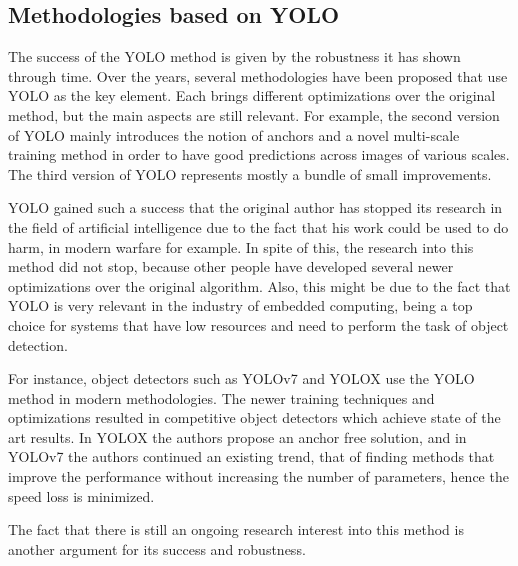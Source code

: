\subsection{Methodologies based on YOLO}

The success of the YOLO method is given by the robustness it has shown through time. Over the years, several methodologies have been proposed that use YOLO as the key element. Each brings different optimizations over the original method, but the main aspects are still relevant. For example, the second version of YOLO \cite{yolov2} mainly introduces the notion of anchors and a novel multi-scale training method in order to have good predictions across images of various scales. The third version of YOLO \cite{yolov3} represents mostly a bundle of small improvements. 

YOLO gained such a success that the original author has stopped its research in the field of artificial intelligence due to the fact that his work could be used to do harm, in modern warfare for example. In spite of this, the research into this method did not stop, because other people have developed several newer optimizations over the original algorithm. Also, this might be due to the fact that YOLO is very relevant in the industry of embedded computing, being a top choice for systems that have low resources and need to perform the task of object detection.

For instance, object detectors such as YOLOv7 \cite{yolov7} and YOLOX \cite{yolox} use the YOLO method in modern methodologies. The newer training techniques and optimizations resulted in competitive object detectors which achieve state of the art results. In YOLOX the authors propose an anchor free solution, and in YOLOv7 the authors continued an existing trend, that of finding methods that improve the performance without increasing the number of parameters, hence the speed loss is minimized.

The fact that there is still an ongoing research interest into this method is another argument for its success and robustness.